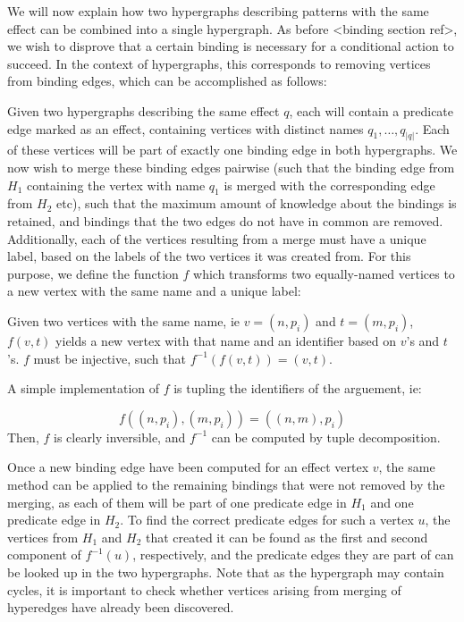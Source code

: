 \documentclass[../Master.tex]{subfiles}
\begin{document}
We will now explain how two hypergraphs describing patterns with the same effect can be combined into a single hypergraph. As before <binding section ref>, we wish to disprove that a certain binding is necessary for a conditional action to succeed. In the context of hypergraphs, this corresponds to removing vertices from binding edges, which can be accomplished as follows:

Given two hypergraphs describing the same effect $q$, each will contain a predicate edge marked as an effect, containing vertices with distinct names $q_1, \ldots, q_{|q|}$. Each of these vertices will be part of exactly one binding edge in both hypergraphs. We now wish to merge these binding edges pairwise (such that the binding edge from $H_1$ containing the vertex with name $q_1$ is merged with the corresponding edge from $H_2$ etc), such that the maximum amount of knowledge about the bindings is retained, and bindings that the two edges do not have in common are removed. Additionally, each of the vertices resulting from a merge must have a unique label, based on the labels of the two vertices it was created from. For this purpose, we define the function $f$ which transforms two equally-named vertices to a new vertex with the same name and a unique label:

\begin{definition}
    Given two vertices with the same name, ie $v = \left(n, p_i \right)$ and $t = \left( m, p_i \right)$, $f(v,t)$ yields a new vertex with that name and an identifier based on $v$'s and $t$'s. $f$ must be injective, such that $f^{-1}(f(v,t)) = (v,t)$.
\end{definition}

A simple implementation of $f$ is tupling the identifiers of the arguement, ie:

\begin{equation*}
   f\left( \left(n, p_i \right), \left(m, p_i \right) \right) =
       \left( (n,m), p_i \right)
\end{equation*}
Then, $f$ is clearly inversible, and $f^{-1}$ can be computed by tuple decomposition.

Once a new binding edge have been computed for an effect vertex $v$, the same method can be applied to the remaining bindings that were not removed by the merging, as each of them will be part of one predicate edge in $H_1$ and one predicate edge in $H_2$. To find the correct predicate edges for such a vertex $u$, the vertices from $H_1$ and $H_2$ that created it can be found as the first and second component of $f^{-1}(u)$, respectively, and the predicate edges they are part of can be looked up in the two hypergraphs. Note that as the hypergraph may contain cycles, it is important to check whether vertices arising from merging of hyperedges have already been discovered.
\end{document}
